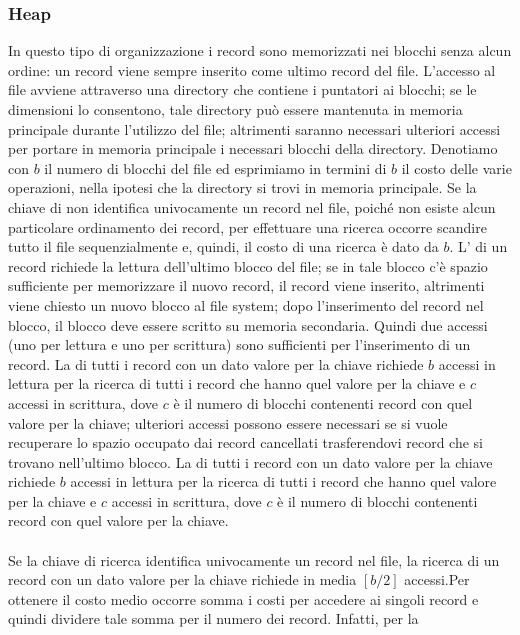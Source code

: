 \subsubsection{Heap}
In questo tipo di organizzazione i record sono memorizzati nei blocchi senza alcun ordine: un
record viene sempre inserito come ultimo record del file. L'accesso al file avviene attraverso una
directory che contiene i puntatori ai blocchi; se le dimensioni lo consentono, tale directory può
essere mantenuta in memoria principale durante l'utilizzo del file; altrimenti saranno necessari
ulteriori accessi per portare in memoria principale i necessari blocchi della directory.
Denotiamo con $b$ il numero di blocchi del file ed esprimiamo in termini di $b$ il costo delle varie
operazioni, nella ipotesi che la directory si trovi in memoria principale.
Se la chiave di  non identifica univocamente un record nel file, poiché non esiste alcun
particolare ordinamento dei record, per effettuare una ricerca occorre scandire tutto il file
sequenzialmente e, quindi, il costo di una ricerca è dato da $b$. L' di un record richiede la
lettura dell'ultimo blocco del file; se in tale blocco c'è spazio sufficiente per memorizzare il nuovo
record, il record viene inserito, altrimenti viene chiesto un nuovo blocco al file system; dopo
l'inserimento del record nel blocco, il blocco deve essere scritto su memoria secondaria. Quindi due
accessi (uno per lettura e uno per scrittura) sono sufficienti per l'inserimento di un record. La
 di tutti i record con un dato valore per la chiave richiede $b$ accessi in lettura 
per la ricerca di tutti i record che hanno quel valore per la chiave e $c$ accessi in scrittura, dove $c$ è il
numero di blocchi contenenti record con quel valore per la chiave; ulteriori accessi possono essere
necessari se si vuole recuperare lo spazio occupato dai record cancellati trasferendovi record che si
trovano nell'ultimo blocco. La  di tutti i record con un dato valore per la chiave richiede $b$
accessi in lettura per la ricerca di tutti i record che hanno quel valore per la chiave e $c$ accessi in
scrittura, dove $c$ è il numero di blocchi contenenti record con quel valore per la chiave.\\\\
Se la chiave di ricerca identifica univocamente un record nel file, la ricerca di un record con un dato
valore per la chiave richiede in media $[b/2]$ accessi.Per ottenere il costo medio occorre somma i costi 
per accedere ai singoli record e quindi dividere tale somma per il numero dei record. Infatti, per la 
